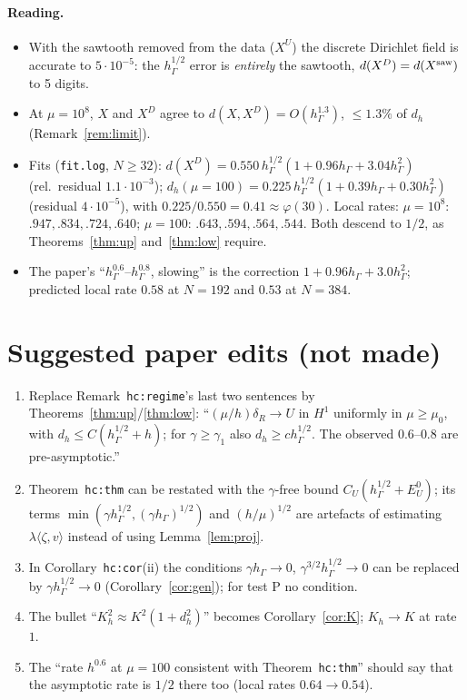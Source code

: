 \documentclass[11pt]{article}
\theoremstyle{remark}
\newcommand{\hG}{h_\Gamma}
\newcommand{\ip}[2]{\langle #1,#2\rangle}
\newcommand{\EU}{E^{0}_{U}}
\begin{document}
\paragraph{Reading.}
\begin{itemize}
\item With the sawtooth removed from the data ($X^U$) the discrete Dirichlet field is accurate to $5\cdot10^{-5}$: the $\hG^{1/2}$ error is \emph{entirely} the sawtooth, $d(X^D)=d(X^{\rm saw})$ to 5 digits.
\item At $\mu=10^8$, $X$ and $X^D$ agree to $d(X,X^D)=O(\hG^{1.3})$, $\le1.3\%$ of $d_h$ (Remark~\ref{rem:limit}).
\item Fits (\texttt{fit.log}, $N\ge32$): $d(X^D)=0.550\,\hG^{1/2}(1+0.96\hG+3.04\hG^2)$ (rel.\ residual $1.1\cdot10^{-3}$); $d_h(\mu{=}100)=0.225\,\hG^{1/2}(1+0.39\hG+0.30\hG^2)$ (residual $4\cdot10^{-5}$), with $0.225/0.550=0.41\approx\varphi(30)$. Local rates: $\mu=10^8$: $.947,.834,.724,.640$; $\mu=100$: $.643,.594,.564,.544$. Both descend to $1/2$, as Theorems~\ref{thm:up} and~\ref{thm:low} require.
\item The paper's ``$\hG^{0.6}$--$\hG^{0.8}$, slowing'' is the correction $1+0.96\hG+3.0\hG^2$; predicted local rate $0.58$ at $N=192$ and $0.53$ at $N=384$.
\end{itemize}

\section{Suggested paper edits (not made)}
\begin{enumerate}
\item Replace Remark~\texttt{hc:regime}'s last two sentences by Theorems~\ref{thm:up}/\ref{thm:low}: ``$(\mu/h)\delta_R\to U$ in $H^1$ uniformly in $\mu\ge\mu_0$, with $d_h\le C(\hG^{1/2}+h)$; for $\gamma\ge\gamma_1$ also $d_h\ge c\hG^{1/2}$. The observed $0.6$--$0.8$ are pre-asymptotic.''
\item Theorem~\texttt{hc:thm} can be restated with the $\gamma$-free bound $C_U(\hG^{1/2}+\EU)$; its terms $\min(\gamma\hG^{1/2},(\gamma\hG)^{1/2})$ and $(h/\mu)^{1/2}$ are artefacts of estimating $\lambda\ip\zeta v$ instead of using Lemma~\ref{lem:proj}.
\item In Corollary~\texttt{hc:cor}(ii) the conditions $\gamma\hG\to0$, $\gamma^{3/2}\hG^{1/2}\to0$ can be replaced by $\gamma\hG^{1/2}\to0$ (Corollary~\ref{cor:gen}); for test P no condition.
\item The bullet ``$K_h^2\approx K^2(1+d_h^2)$'' becomes Corollary~\ref{cor:K}; $K_h\to K$ at rate $1$.
\item The ``rate $h^{0.6}$ at $\mu=100$ consistent with Theorem~\texttt{hc:thm}'' should say that the asymptotic rate is $1/2$ there too (local rates $0.64\to0.54$).
\end{enumerate}
\end{document}
